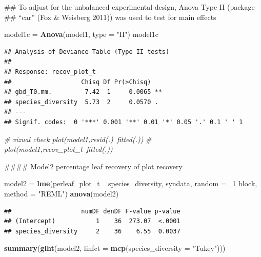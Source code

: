 \documentclass[]{article}
\newenvironment{Shaded}{}{}
\newcommand{\KeywordTok}[1]{\textcolor[rgb]{0.00,0.44,0.13}{\textbf{{#1}}}}
\newcommand{\DataTypeTok}[1]{\textcolor[rgb]{0.56,0.13,0.00}{{#1}}}
\newcommand{\DecValTok}[1]{\textcolor[rgb]{0.25,0.63,0.44}{{#1}}}
\newcommand{\StringTok}[1]{\textcolor[rgb]{0.25,0.44,0.63}{{#1}}}
\newcommand{\CommentTok}[1]{\textcolor[rgb]{0.38,0.63,0.69}{\textit{{#1}}}}
\newcommand{\NormalTok}[1]{{#1}}
\begin{document}
\begin{Shaded}
\begin{Highlighting}[]

\NormalTok{## To adjust for the unbalanced experimental design, Anova Type II (package}
\NormalTok{## “car” (Fox & Weisberg 2011)) was used to test for main effects}

\NormalTok{model1c = }\KeywordTok{Anova}\NormalTok{(model1, }\DataTypeTok{type =} \StringTok{"II"}\NormalTok{)}
\NormalTok{model1c}
\end{Highlighting}
\end{Shaded}

\begin{verbatim}
## Analysis of Deviance Table (Type II tests)
## 
## Response: recov_plot_t
##                   Chisq Df Pr(>Chisq)   
## gbd_T0.mm.         7.42  1     0.0065 **
## species_diversity  5.73  2     0.0570 . 
## ---
## Signif. codes:  0 '***' 0.001 '**' 0.01 '*' 0.05 '.' 0.1 ' ' 1
\end{verbatim}

\begin{Shaded}
\begin{Highlighting}[]

\CommentTok{# vizual check plot(model1,resid(.)~fitted(.))}
\CommentTok{# plot(model1,recov_plot_t~fitted(.))}

\NormalTok{#### Model2 percentage leaf recovery of plot recovery}

\NormalTok{model2 = }\KeywordTok{lme}\NormalTok{(perleaf_plot_t ~ species_diversity, syndata, }\DataTypeTok{random =} \NormalTok{~}\DecValTok{1} \NormalTok{\textbar{} block, }
    \DataTypeTok{method =} \StringTok{"REML"}\NormalTok{)}
\KeywordTok{anova}\NormalTok{(model2)}
\end{Highlighting}
\end{Shaded}

\begin{verbatim}
##                   numDF denDF F-value p-value
## (Intercept)           1    36  273.07  <.0001
## species_diversity     2    36    6.55  0.0037
\end{verbatim}

\begin{Shaded}
\begin{Highlighting}[]
\KeywordTok{summary}\NormalTok{(}\KeywordTok{glht}\NormalTok{(model2, }\DataTypeTok{linfct =} \KeywordTok{mcp}\NormalTok{(}\DataTypeTok{species_diversity =} \StringTok{"Tukey"}\NormalTok{)))}
\end{Highlighting}
\end{Shaded}
\end{document}
